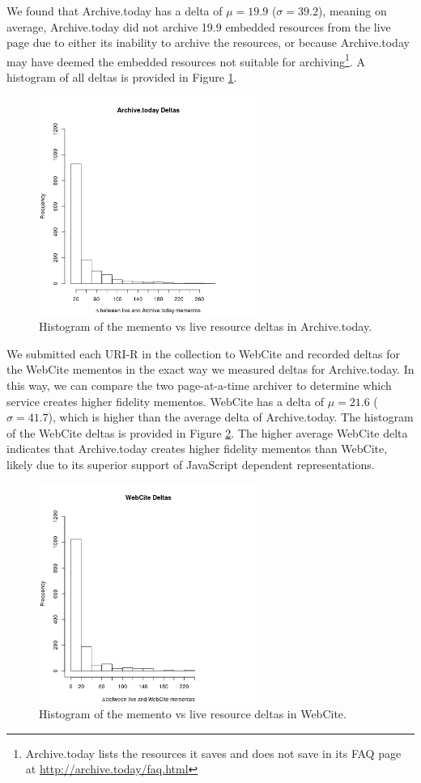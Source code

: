We found that Archive.today has a delta of $\mu=19.9$ ($\sigma=39.2$), meaning on average, Archive.today did not archive 19.9 embedded resources from the live page due to either its inability to archive the resources, or because Archive.today may have deemed the embedded resources not suitable for archiving\footnote{Archive.today lists the resources it saves and does not save in its FAQ page at \url{http://archive.today/faq.html}}. A histogram of all deltas is provided in Figure \ref{athisto}.

\begin{figure}[h!]
\includegraphics[width=270px]{./imgs/atHisto.png}
\caption{Histogram of the memento vs live resource deltas in Archive.today.}
\label{athisto}
\end{figure}

We submitted each URI-R in the collection to WebCite and recorded deltas for the WebCite mementos in the exact way we measured deltas for Archive.today. In this way, we can compare the two page-at-a-time archiver to determine which service creates higher fidelity mementos. WebCite has a delta of $\mu=21.6$ ($\sigma=41.7$), which is higher than the average delta of Archive.today. The histogram of the WebCite deltas is provided in Figure \ref{wchisto}. The higher average WebCite delta indicates that Archive.today creates higher fidelity mementos than WebCite, likely due to its superior support of JavaScript dependent representations.

\begin{figure}[h!]
\includegraphics[width=270px]{./imgs/wcHisto.png}
\caption{Histogram of the memento vs live resource deltas in WebCite.}
\label{wchisto}
\end{figure}


